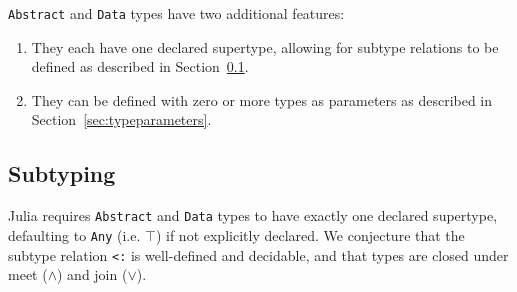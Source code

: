 \documentclass[10pt, preprint]{sigplanconf}
\begin{document}
\verb|Abstract| and \verb|Data| types have two additional features:

\begin{enumerate}
	\item They each have one declared supertype, allowing for subtype
	relations to be defined as described in Section~\ref{sec:subtyping}.

	\item They can be defined with zero or more types as parameters as
	described in Section~\ref{sec:typeparameters}.
\end{enumerate}


\subsection{Subtyping}
\label{sec:subtyping}

Julia requires \verb|Abstract| and \verb|Data| types to have exactly one
declared supertype, defaulting to \verb|Any| (i.e. $\top$) if not explicitly declared.
We conjecture that the subtype relation \verb|<:| is well-defined and
decidable, and that types are closed under meet ($\wedge$) and
join ($\vee$).


\end{document}
